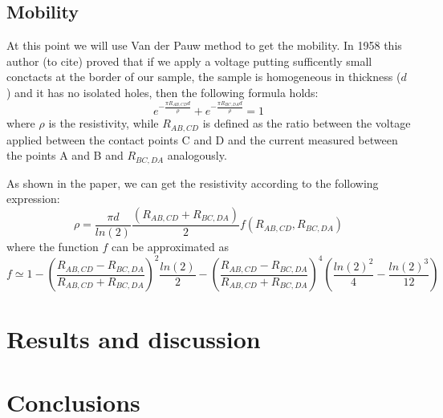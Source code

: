 \documentclass[11pt,a4paper]{article}
\begin{document}
\subsection{Mobility}
At this point we will use Van der Pauw method to get the mobility. In 1958 this author (to cite) proved that if we apply a voltage putting sufficently small conctacts at the border of our sample, the sample is homogeneous in thickness ($d$) and it has no isolated holes, then the following formula holds:
\begin{equation}
e^{-\frac{\pi R_{AB,CD}d}{\rho}}+e^{-\frac{\pi R_{BC,DA}d}{\rho}}=1
\end{equation}
where $\rho$ is the resistivity, while $R_{AB,CD}$ is defined as the ratio between the voltage applied between the contact points C and D and the current measured between the points A and B and $R_{BC,DA}$ analogously.

As shown in the paper, we can get the resistivity according to the following expression:
\begin{equation}
\rho=\frac{\pi d}{ln(2)}\frac{(R_{AB,CD}+R_{BC,DA})}{2}f\left(R_{AB,CD},R_{BC,DA}\right)
\end{equation}
where the function $f$ can be approximated as
\begin{equation}
f \simeq 1-\left(\frac{R_{AB,CD}-R_{BC,DA}}{R_{AB,CD}+R_{BC,DA}}\right)^2 \frac{ln(2)}{2}-\left(\frac{R_{AB,CD}-R_{BC,DA}}{R_{AB,CD}+R_{BC,DA}}\right)^4\left(\frac{ln(2)^2}{4}-\frac{ln(2)^3}{12}\right)
\end{equation}

\section{Results and discussion}


\section{Conclusions}

%
%

\begin{appendices}


\end{appendices}
\end{document}
